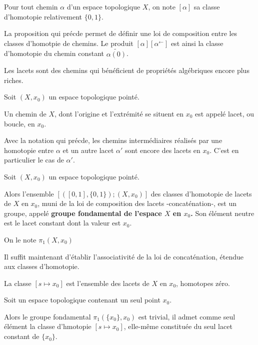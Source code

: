 Pour tout chemin $\alpha$ d'un espace topologique $X$, %
on note $[\alpha ]$ sa classe d'homotopie relativement  $\{0,1\}$.

\par
La proposition qui pr\'ecde permet de d\'efinir une loi de composition entre les classes d'homotpie de chemins. %
Le produit $[\alpha ][\alpha^{\leftarrow}]$ est ainsi la classe d'homotopie du chemin constant $\tilde{\alpha (0)}$.

\par
Les lacets sont des chemins qui b\'en\'eficient de propri\'et\'es alg\'ebriques encore plus riches.

\begin{defi}[Lacets]
Soit $(X,x_0)$ un espace topologique point\'e.

\par
Un chemin de $X$, dont l'origine et l'extr\'emit\'e se situent en $x_0$ est appel\'e lacet, ou boucle, en $x_0$.
\end{defi}

\begin{rema}
Avec la notation qui pr\'ecde, les chemins interm\'ediaires r\'ealis\'es par une homotopie entre $\alpha$ et un autre lacet $\alpha '$ %
sont encore des lacets en $x_0$. C'est en particulier le cas de $\alpha '$.
\end{rema}

\begin{prefi}
Soit $(X,x_0)$ un espace topologique point\'e.

\par
Alors l'ensemble $[([0,1],\{0,1\});(X,x_0)]$ des classes d'homotopie de lacets de $X$ en $x_0$, %
muni de la loi de composition des lacets -concat\'enation-, est un groupe, appel\'e %
\textbf{groupe fondamental de l'espace $X$ en $x_0$.} Son \'el\'ement neutre est le lacet constant dont la valeur est $x_0$.

\par
On le note $\pi_1(X,x_0)$
\end{prefi}

\es Il suffit maintenant d'\'etablir l'associativit\'e de la loi de concat\'enation, \'etendue aux classes d'homotopie.

\begin{rema}
La classe $[s\mapsto x_0]$ est l'ensemble des lacets de $X$ en $x_0$, homotopes  z\'ero.
\end{rema}

\begin{exem}
Soit un espace topologique contenant un seul point $x_0$.

\par
Alors le groupe fondamental $\pi_1(\{x_0\},x_0)$ est trivial, %
il admet comme seul \'el\'ement la classe d'hmotopie $[s\mapsto x_0]$, elle-m\^eme constitu\'ee du seul lacet constant de $\{x_0\}$.
\end{exem}

